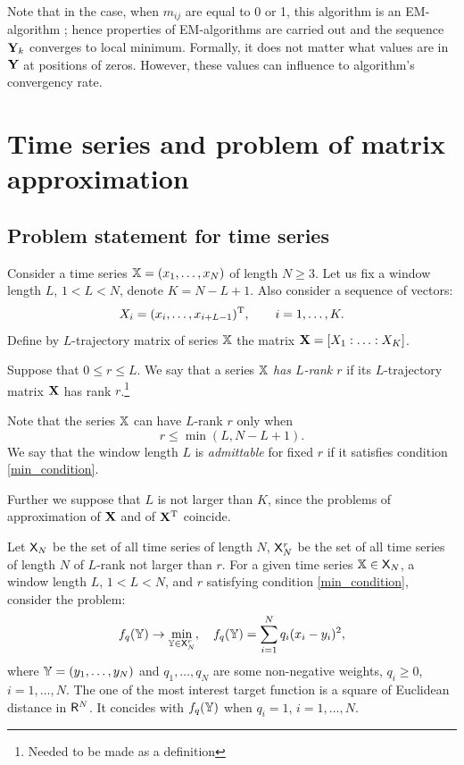 \documentclass[sii]{ipart}
\begin{document}
Note that in the case, when $m_{ij}$ are equal to 0 or 1, this algorithm is an EM-algorithm \cite{Srebro2003};
hence properties of EM-algorithms are carried out and the sequence $\mathbf{Y}_k$ converges to local minimum. Formally, it does not matter what values are in $\mathbf{Y}$ at positions of zeros. However, these values can influence to algorithm's convergency rate.

\section{Time series and problem of matrix approximation}
\label{sec:ts_matrices}
\subsection{Problem statement for time series}
Consider a time series $\mathbb{X} = (x_1, \ldots, x_N)$ of length $N \ge 3$. Let us fix a window length $L$, $1 < L < N$, denote $K = N - L + 1$. Also consider a sequence of vectors:
\begin{equation}\label{l_lagged}
X_i = (x_i, \ldots, x_{i + L - 1})^\rmT, \qquad i = 1, \ldots, K.
\end{equation}
Define by $L$-trajectory matrix of series $\mathbb{X}$ the matrix $\mathbf{X} = [X_1:\ldots:X_K]$.

Suppose that $0 \le r \le L$. We say that a series $\mathbb{X}$ \emph{has $L$-rank $r$} if its $L$-trajectory matrix $\mathbf{X}$ has rank $r$.\footnote{Needed to be made as a definition}

Note that the series $\mathbb{X}$ can have $L$-rank $r$ only when
\begin{equation}
r \le \min(L, N-L+1). \label{min_condition}
\end{equation}
We say that the window length $L$ is \emph{admittable} for fixed $r$ if it satisfies condition \eqref{min_condition}.

Further we suppose that $L$ is not larger than $K$, since the problems of approximation of $\mathbf{X}$ and of $\mathbf{X}^{\mathrm{T}}$ coincide.

Let $\mathsf{X}_N$ be the set of all time series of length $N$, $\mathsf{X}_N^r$ be the set of all time series of length $N$ of $L$-rank not larger than $r$. For a given time series $\mathbb{X} \in \mathsf{X}_N$, a window length $L$, $1 < L < N$, and $r$ satisfying condition \eqref{min_condition}, consider the problem:
\begin{equation} \label{L-rank_task}
f_q(\tsY) \to \min_{\tsY \in \sfX_N^r}, \quad f_q(\tsY) = \sum \limits_{i=1}^N q_i(x_i - y_i)^2,
\end{equation}
where $\mathbb{Y} = (y_1, \ldots, y_N)$ and $q_1, \ldots, q_N$ are some non-negative weights,
$q_i \ge 0$, $i = 1, \ldots, N$. The one of the most interest target function is a square of Euclidean distance in $\mathsf{R}^N$. It concides with $f_q(\mathbb{Y})$ when $q_i = 1$, $i = 1, \ldots, N$.
\end{document}
